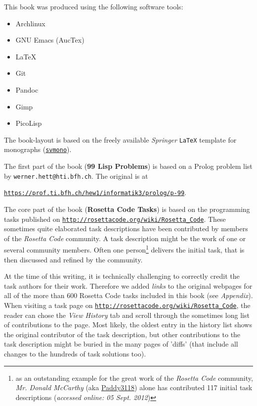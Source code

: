 %
%


This book was produced using the following software tools:

\begin{itemize}
\item Archlinux
\item GNU Emacs (AucTex)
\item LaTeX
\item Git
\item Pandoc
\item Gimp
\item PicoLisp
\end{itemize}

The book-layout is based on the freely available \emph{Springer}
\texttt{LaTeX} template for monographs
(\href{http://www.springer.com/authors/book+authors?SGWID=0-154102-12-970131-0}{\texttt{svmono}}).

The first part of the book (\textbf{99 Lisp Problems}) is based on a Prolog
problem list by \texttt{werner.hett@hti.bfh.ch}. The original is at

\href{https://prof.ti.bfh.ch/hew1/informatik3/prolog/p-99}{\texttt{https://prof.ti.bfh.ch/hew1/informatik3/prolog/p-99}}.

The core part of the book (\textbf{Rosetta Code Tasks}) is based on
the programming tasks published on
\href{http://rosettacode.org/wiki/Rosetta_Code}{\texttt{http://rosettacode.org/wiki/Rosetta\_Code}}.
These sometimes quite elaborated task descriptions have been
contributed by members of the \emph{Rosetta Code} community. A task
description might be the work of one or several community members.
Often one person\footnote{as an outstanding example for the great work
  of the \emph{Rosetta Code} community, \emph{Mr. Donald McCarthy} (aka
  \href{http://rosettacode.org/wiki/User:Paddy3118}{Paddy3118}) alone
  has contributed 117 initial task descriptions (\emph{accessed online:
  05 Sept. 2012})} delivers the initial task, that is then discussed and
refined by the community.

At the time of this writing, it is technically challenging to
correctly credit the task authors for their work. Therefore we
added \emph{links} to the original webpages for all of the more
than 600 Rosetta Code tasks included in this book (see
\emph{Appendix}). When visiting a task page on
\href{http://rosettacode.org/wiki/Rosetta_Code}{\texttt{http://rosettacode.org/wiki/Rosetta\_Code}},
the reader can chose the \emph{View History} tab and scroll through
the sometimes long list of contributions to the page. Most likely, the
oldest entry in the history list shows the original contributor of the
task description, but other contributions to the task description
might be buried in the many pages of 'diffs' (that include all
changes to the hundreds of task solutions too).

